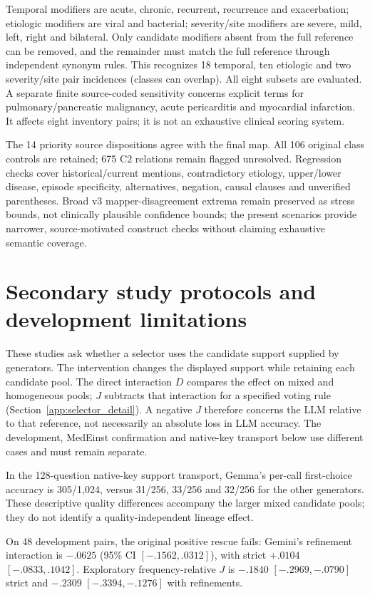 Temporal modifiers are acute, chronic, recurrent, recurrence and exacerbation; etiologic modifiers are viral and bacterial; severity/site modifiers are severe, mild, left, right and bilateral. Only candidate modifiers absent from the full reference can be removed, and the remainder must match the full reference through independent synonym rules. This recognizes 18 temporal, ten etiologic and two severity/site pair incidences (classes can overlap). All eight subsets are evaluated. A separate finite source-coded sensitivity concerns explicit terms for pulmonary/pancreatic malignancy, acute pericarditis and myocardial infarction. It affects eight inventory pairs; it is not an exhaustive clinical scoring system.

The 14 priority source dispositions agree with the final map. All 106 original class controls are retained; 675 C2 relations remain flagged unresolved. Regression checks cover historical/current mentions, contradictory etiology, upper/lower disease, episode specificity, alternatives, negation, causal clauses and unverified parentheses. Broad v3 mapper-disagreement extrema remain preserved as stress bounds, not clinically plausible confidence bounds; the present scenarios provide narrower, source-motivated construct checks without claiming exhaustive semantic coverage.

\section{Secondary study protocols and development limitations}\label{app:support_screens}
These studies ask whether a selector uses the candidate support supplied by generators. The intervention changes the displayed support while retaining each candidate pool. The direct interaction $D$ compares the effect on mixed and homogeneous pools; $J$ subtracts that interaction for a specified voting rule (Section~\ref{app:selector_detail}). A negative $J$ therefore concerns the LLM relative to that reference, not necessarily an absolute loss in LLM accuracy. The development, MedEinst confirmation and native-key transport below use different cases and must remain separate.

In the 128-question native-key support transport, Gemma's per-call first-choice accuracy is 305/1,024, versus 31/256, 33/256 and 32/256 for the other generators. These descriptive quality differences accompany the larger mixed candidate pools; they do not identify a quality-independent lineage effect.

On 48 development pairs, the original positive rescue fails: Gemini's refinement interaction is $-.0625$ (95\% CI $[-.1562,.0312]$), with strict $+.0104$ $[-.0833,.1042]$. Exploratory frequency-relative $J$ is $-.1840$ $[-.2969,-.0790]$ strict and $-.2309$ $[-.3394,-.1276]$ with refinements.

